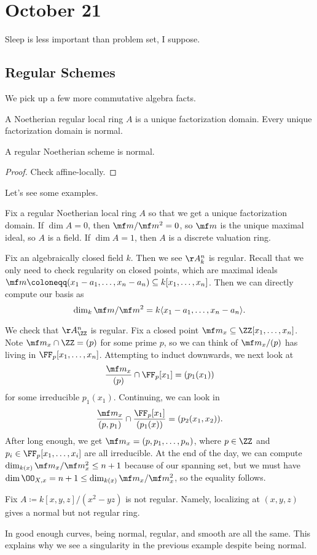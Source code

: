 \documentclass[../notes.tex]{subfiles}
\begin{document}
\section{October 21}

Sleep is less important than problem set, I suppose.

\subsection{Regular Schemes}
We pick up a few more commutative algebra facts.
\begin{theorem}
	A Noetherian regular local ring $A$ is a unique factorization domain. Every unique factorization domain is normal.
\end{theorem}
\begin{corollary}
	A regular Noetherian scheme is normal.
\end{corollary}
\begin{proof}
	Check affine-locally.
\end{proof}
Let's see some examples.
\begin{example}
	Fix a regular Noetherian local ring $A$ so that we get a unique factorization domain. If $\dim A=0$, then $\mf m/\mf m^2=0$, so $\mf m$ is the unique maximal ideal, so $A$ is a field. If $\dim A=1$, then $A$ is a discrete valuation ring.
\end{example}
\begin{example}
	Fix an algebraically closed field $k$. Then we see $\AA^n_k$ is regular. Recall that we only need to check regularity on closed points, which are maximal ideals $\mf m\coloneqq(x_1-a_1,\ldots,x_n-a_n)\subseteq k[x_1,\ldots,x_n]$. Then we can directly compute our basis as
	\[\dim_k\mf m/\mf m^2=k\langle x_1-a_1,\ldots,x_n-a_n\rangle.\]
\end{example}
\begin{example}
	We check that $\AA^n_\ZZ$ is regular. Fix a closed point $\mf m_x\subseteq\ZZ[x_1,\ldots,x_n]$. Note $\mf m_x\cap\ZZ=(p)$ for some prime $p$, so we can think of $\mf m_x/(p)$ has living in $\FF_p[x_1,\ldots,x_n]$. Attempting to induct downwards, we next look at
	\[\frac{\mf m_x}{(p)}\cap\FF_p[x_1]=(p_1(x_1))\]
	for some irreducible $p_1(x_1)$. Continuing, we can look in
	\[\frac{\mf m_x}{(p,p_1)}\cap\frac{\FF_p[x_1]}{(p_1(x))}=(p_2(x_1,x_2)).\]
	After long enough, we get $\mf m_x=(p,p_1,\ldots,p_n)$, where $p\in\ZZ$ and $p_i\in\FF_p[x_1,\ldots,x_i]$ are all irreducible. At the end of the day, we can compute $\dim_{k(x)}\mf m_x/\mf m_x^2\le n+1$ because of our spanning set, but we must have $\dim\OO_{X,x}=n+1\le\dim_{k(x)}\mf m_x/\mf m_x^2$, so the equality follows.
\end{example}
\begin{nex}
	Fix $A\coloneqq k[x,y,z]/(x^2-yz)$ is not regular. Namely, localizing at $(x,y,z)$ gives a normal but not regular ring.
\end{nex}
\begin{remark}
	In good enough curves, being normal, regular, and smooth are all the same. This explains why we see a singularity in the previous example despite being normal.
\end{remark}
\end{document}

